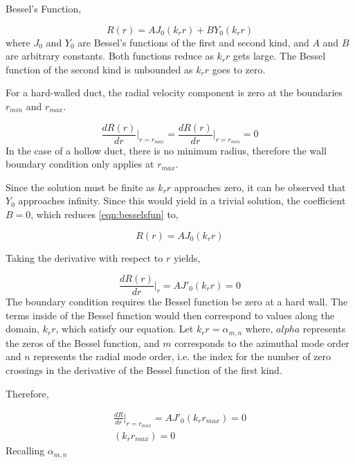 Bessel's Function,

\begin{equation}
    R(r) = A J_0 (k_r r) + B Y_0(k_r r ) 
    \label{eqn:besselsfun}
\end{equation}
where $J_0$ and $Y_0$ are Bessel's functions of the first 
and second kind, and $A$ and $B$ are arbitrary constants. 
Both functions reduce as $k_r r$ gets large. The Bessel function of the second
kind is unbounded as $k_r r$ goes to zero. 

For a hard-walled duct, the radial velocity component is zero at the 
boundaries $r_{min}$ and $r_{max}$. 

\begin{equation}
    \frac{dR(r)}{dr}\Bigr|_{r = r_{max}}  =%
    \frac{dR(r)}{dr}\Bigr|_{r = r_{min}}   = 0
    \label{eqn:besselBC}
\end{equation}
In the case of a hollow duct, there is no
minimum radius, therefore the wall boundary condition only applies at $r_{max}$.


Since the solution must be finite as $k_r r$ approaches zero, it can be observed
that $Y_0$ approaches infinity. Since this would yield in a trivial solution, the 
coefficient $B = 0$, which reduces \ref{eqn:besselsfun} to,

\begin{equation}
    R(r) = A J_0 (k_r r) 
    \label{eqn:besselsfunCylinder}
\end{equation}

Taking the derivative 
with respect to $r$ yields,

\begin{equation}
    \frac{dR(r)}{dr}\Bigr|_{r} = A J'_0 (k_r r)  = 0
    \label{eqn:besselsfunderivaTive}
\end{equation}
The boundary condition requires the Bessel function be zero at a hard wall.
The terms inside of the Bessel function would then correspond to values along 
the domain, $k_r r$,  which satisfy our equation.  Let $k_r r = \alpha_{m,n}$ 
where, $alpha$ represents the zeros of the Bessel function, and 
$m$ corresponds to the azimuthal mode order and $n$ represents the radial mode
order, i.e. the index for the number of zero crossings in the 
derivative of the Bessel function of the first kind. 

Therefore,


\begin{align}
    \frac{dR}{dr}\Bigr|_{r = r_{max}} = A J'_0 (k_r r_{max})  = 0 \\
    (k_r r_{max})  = 0 
\end{align}
Recalling $\alpha_{m,n}$



